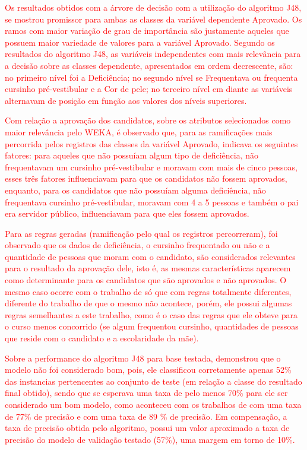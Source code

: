 \par
\textcolor{red}{Os resultados obtidos com a árvore de decisão com a utilização do algoritmo J48, se mostrou promissor para ambas as classes da variável dependente Aprovado. Os ramos com maior variação de grau de importância são justamente aqueles que possuem maior variedade de valores para a variável Aprovado. Segundo os resultados do algoritmo J48, as variáveis independentes com mais relevância para a decisão sobre as classes dependente, apresentados em ordem decrescente, são: no primeiro nível foi a Deficiência; no segundo nível se Frequentava ou frequenta cursinho pré-vestibular e a Cor de pele; no terceiro nível em diante as variáveis alternavam de posição em função aos valores dos níveis superiores.}

\par
\textcolor{red}{Com relação a aprovação dos candidatos, sobre os atributos selecionados como maior relevância pelo WEKA, é observado que, para as ramificações mais percorrida pelos registros das classes da variável Aprovado, indicava os seguintes fatores: para aqueles que não possuíam algum tipo de deficiência, não frequentavam um cursinho pré-vestibular e moravam com mais de cinco pessoas, esses três fatores influenciavam para que os candidatos não fossem aprovados, enquanto, para os candidatos que não possuíam alguma deficiência, não frequentava cursinho pré-vestibular, moravam com 4 a 5 pessoas e também o pai era servidor público, influenciavam para que eles fossem aprovados.}

\par
\textcolor{red}{Para as regras geradas (ramificação pelo qual os registros percorreram),  foi observado que os dados de deficiência, o cursinho frequentado ou não e a quantidade de pessoas que moram com o candidato, são considerados relevantes para o resultado da aprovação dele, isto é, as mesmas características aparecem como determinante para os candidatos que são aprovados e não aprovados.  O mesmo caso ocorre com o trabalho de  só que com regras totalmente diferentes, diferente do trabalho de  que o mesmo não acontece, porém, ele possui algumas regras semelhantes a este trabalho, como é o caso das regras que ele obteve para o curso menos concorrido (se algum frequentou cursinho, quantidades de pessoas que reside com o candidato e a escolaridade da mãe).}


\par
\textcolor{red}{Sobre a performance do algoritmo J48 para base testada, demonstrou que o modelo não foi considerado bom, pois, ele classificou corretamente apenas 52\% das instancias pertencentes ao conjunto de teste (em relação a classe do resultado final obtido), sendo que se esperava uma taxa de pelo menos 70\% para ele ser considerado um bom modelo, como aconteceu com os trabalhos de   com uma taxa de 77\% de precisão e  com uma taxa de 89 \% de precisão. Em compensação, a taxa de precisão obtida pelo algoritmo, possui um valor aproximado a taxa de precisão do modelo de validação testado (57\%), uma margem em torno de 10\%.}


